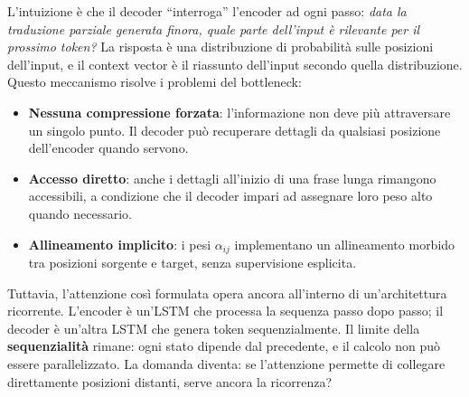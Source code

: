 L'intuizione è che il decoder ``interroga'' l'encoder ad ogni passo: \textit{data la traduzione parziale generata finora, quale parte dell'input è rilevante per il prossimo token?} La risposta è una distribuzione di probabilità sulle posizioni dell'input, e il context vector è il riassunto dell'input secondo quella distribuzione.
Questo meccanismo risolve i problemi del bottleneck:
\begin{itemize}
    \item \textbf{Nessuna compressione forzata}: l'informazione non deve più attraversare un singolo punto. Il decoder può recuperare dettagli da qualsiasi posizione dell'encoder quando servono.
    \item \textbf{Accesso diretto}: anche i dettagli all'inizio di una frase lunga rimangono accessibili, a condizione che il decoder impari ad assegnare loro peso alto quando necessario.
    \item \textbf{Allineamento implicito}: i pesi $\alpha_{ij}$ implementano un allineamento morbido tra posizioni sorgente e target, senza supervisione esplicita.
\end{itemize}
Tuttavia, l'attenzione così formulata opera ancora all'interno di un'architettura ricorrente. L'encoder è un'LSTM che processa la sequenza passo dopo passo; il decoder è un'altra LSTM che genera token sequenzialmente. Il limite della \textbf{sequenzialità} rimane: ogni stato dipende dal precedente, e il calcolo non può essere parallelizzato.
La domanda diventa: se l'attenzione permette di collegare direttamente posizioni distanti, serve ancora la ricorrenza?









